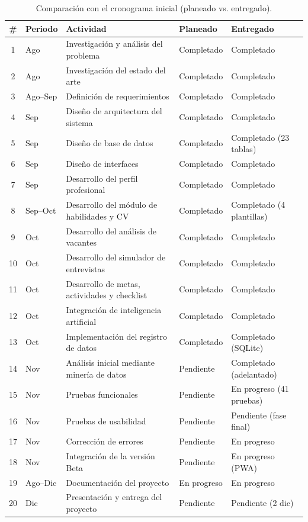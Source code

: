 \documentclass[runningheads]{llncs}
\begin{document}
\begin{table}[htbp]
\caption{Comparación con el cronograma inicial (planeado vs. entregado).}
\label{tab:cronograma}
\centering
\footnotesize
\begin{tabular}{cl p{4.3cm} l l}
\toprule
\# & Periodo & Actividad & Planeado & Entregado\\
\midrule
1 & Ago & Investigación y análisis del problema & Completado & Completado\\
2 & Ago & Investigación del estado del arte & Completado & Completado\\
3 & Ago--Sep & Definición de requerimientos & Completado & Completado\\
4 & Sep & Diseño de arquitectura del sistema & Completado & Completado\\
5 & Sep & Diseño de base de datos & Completado & Completado (23 tablas)\\
6 & Sep & Diseño de interfaces & Completado & Completado\\
7 & Sep & Desarrollo del perfil profesional & Completado & Completado\\
8 & Sep--Oct & Desarrollo del módulo de habilidades y CV & Completado & Completado (4 plantillas)\\
9 & Oct & Desarrollo del análisis de vacantes & Completado & Completado\\
10 & Oct & Desarrollo del simulador de entrevistas & Completado & Completado\\
11 & Oct & Desarrollo de metas, actividades y checklist & Completado & Completado\\
12 & Oct & Integración de inteligencia artificial & Completado & Completado\\
13 & Oct & Implementación del registro de datos & Completado & Completado (SQLite)\\
14 & Nov & Análisis inicial mediante minería de datos & Pendiente & Completado (adelantado)\\
15 & Nov & Pruebas funcionales & Pendiente & En progreso (41 pruebas)\\
16 & Nov & Pruebas de usabilidad & Pendiente & Pendiente (fase final)\\
17 & Nov & Corrección de errores & Pendiente & En progreso\\
18 & Nov & Integración de la versión Beta & Pendiente & En progreso (PWA)\\
19 & Ago--Dic & Documentación del proyecto & En progreso & En progreso\\
20 & Dic & Presentación y entrega del proyecto & Pendiente & Pendiente (2 dic)\\
\bottomrule
\end{tabular}
\end{table}
\end{document}
